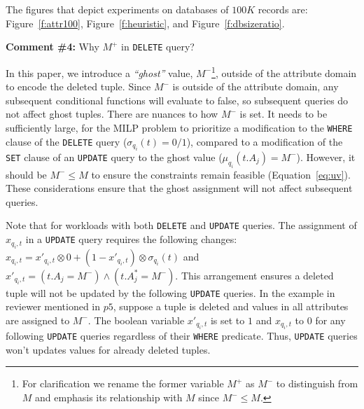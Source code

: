 The figures that depict experiments on databases of $100K$ records are:
Figure~\ref{f:attr100}, Figure~\ref{f:heuristic}, and
Figure~\ref{f:dbsizeratio}.

\comskip

\noindent
\textbf{Comment \#4:} Why $M^+$ in \texttt{DELETE} query?
\begin{quote}
\end{quote}


In this paper, we introduce a \emph{``ghost''} value, 
$M^-$\footnote{For clarification we rename the former variable $M^+$ as $M^-$ to distinguish
from $M$ and emphasis its relationship with $M$ since $M^- \leq M$.}, outside of the attribute domain
to encode the deleted tuple.
Since $M^-$ is outside of the attribute domain, any subsequent conditional functions will
evaluate to false, so subsequent queries do not affect ghost tuples. There are
nuances to how $M^-$ is set. It needs to be sufficiently large, for the MILP
problem to prioritize a modification to the \texttt{WHERE} clause of the
\texttt{DELETE} query ($\sigma_{q_i}(t) = 0/1$), compared to a modification of
the \texttt{SET} clause of an \texttt{UPDATE} query to the ghost value
($\mu_{q_i}(t.A_j) = M^-$). However, it should be $M^- \leq M $ to ensure the
constraints remain feasible (Equation~\ref{eq:uv}). These considerations
ensure that the ghost assignment will not affect subsequent queries.

Note that for workloads with both \texttt{DELETE} and \texttt{UPDATE} queries.
The assignment of $x_{q_i, t}$ in a \texttt{UPDATE} query 
requires the following changes:
$x_{q_i, t} = x'_{q_i, t} \otimes 0 + (1-x'_{q_i, t}) \otimes \sigma_{q_i}(t)$ and
$x'_{q_i, t}= (t.A_j = M^-) \wedge (t.A_j^* = M^-)$.
This arrangement ensures a deleted tuple will not be updated by the following \texttt{UPDATE} queries. 
In the example in reviewer mentioned in $p5$, suppose a tuple is deleted and values in all attributes are assigned to $M^-$. 
The boolean variable $x'_{q_i, t}$ is set to $1$ and $x_{q_i, t} $ to $0$ for any following \texttt{UPDATE} queries regardless
of their \texttt{WHERE} predicate. Thus, \texttt{UPDATE} queries won't updates values for already deleted tuples. 

